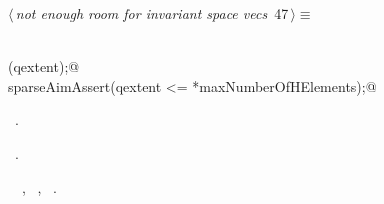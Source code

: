\documentclass{article}
\begin{document}
\begin{flushleft} \small
\begin{minipage}{\linewidth}\label{scrap67}\raggedright\small
{} $\langle\,${\itshape not enough room for invariant space vecs}\nobreak\ {\footnotesize {47}}$\,\rangle\equiv$
\vspace{-1ex}
\begin{list}{}{} \item
\mbox{}\verb@@\\
\mbox{}\verb@bumpSparseAim(qextent);@\\
\mbox{}\verb@      sparseAimAssert(qextent  <= *maxNumberOfHElements);@\\
\mbox{}\verb@@{\NWsep}
\end{list}
\vspace{-1.5ex}
\footnotesize
\begin{list}{}{\setlength{\itemsep}{-\parsep}\setlength{\itemindent}{-\leftmargin}}
\item \NWtxtMacroDefBy\ .
\item \NWtxtMacroRefIn\ .
\item \NWtxtIdentsUsed\nobreak\  \verb@bumpSparseAim@\nobreak\ , \verb@maxNumberOfHElements@\nobreak\ , \verb@qextent@\nobreak\ .
\item{}
\end{list}
\end{minipage}\vspace{4ex}
\end{flushleft}
\end{document}
